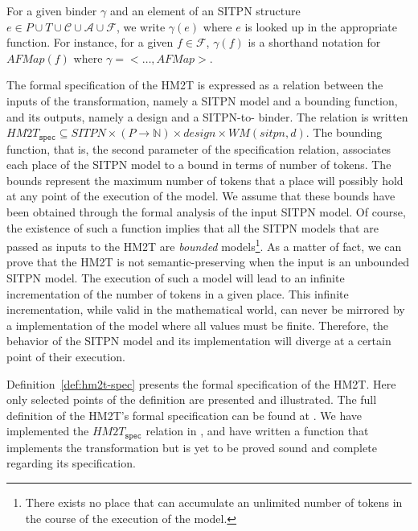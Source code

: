 For a given binder $\gamma$ and an element of an SITPN structure
$e\in{}P\cup{}T\cup\mathcal{C}\cup\mathcal{A}\cup\mathcal{F}$, we
write $\gamma(e)$ where $e$ is looked up in the appropriate
function. For instance, for a given $f\in\mathcal{F}$, $\gamma(f)$ is
a shorthand notation for $AFMap(f)$ where $\gamma={<}\dots,AFMap{>}$.

\bigskip

The formal specification of the HM2T is expressed as a relation
between the inputs of the transformation, namely a SITPN model and a
bounding function, and its outputs, namely a \hvhdl{} design and a
SITPN-to-\hvhdl{} binder. The relation is written
$HM2T_{\mathtt{spec}}\subseteq{}SITPN\times(P\rightarrow\mathbb{N})\times{}design\times{}WM(sitpn,d)$.
The bounding function, that is, the second parameter of the
specification relation, associates each place of the SITPN model to a
bound in terms of number of tokens.  The bounds represent the maximum
number of tokens that a place will possibly hold at any point of the
execution of the model. We assume that these bounds have been obtained
through the formal analysis of the input SITPN model. Of course, the
existence of such a function implies that all the SITPN models that
are passed as inputs to the HM2T are \textit{bounded}
models\footnote{There exists no place that can accumulate an unlimited
  number of tokens in the course of the execution of the model.}. As a
matter of fact, we can prove that the HM2T is not semantic-preserving
when the input is an unbounded SITPN model. The execution of such a
model will lead to an infinite incrementation of the number of tokens
in a given place. This infinite incrementation, while valid in the
mathematical world, can never be mirrored by a \vhdl{} implementation
of the model where all values must be finite. Therefore, the behavior
of the SITPN model and its \hvhdl{} implementation will diverge at a
certain point of their execution.

\bigskip

Definition~\ref{def:hm2t-spec} presents the formal specification of
the HM2T. Here only selected points of the definition are presented
and illustrated. The full definition of the HM2T's formal
specification can be found at . We have implemented the
$HM2T_{\mathtt{spec}}$ relation in \coq{}, and have written a \coq{}
function that implements the transformation but is yet to be proved
sound and complete regarding its specification. %

